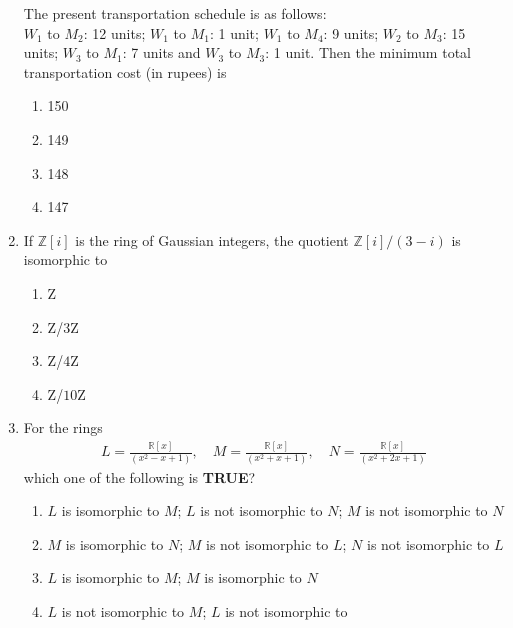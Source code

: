 \documentclass[journal]{IEEEtran}
\numberwithin{equation}{enumi}
\numberwithin{figure}{enumi}
\begin{document}
\begin{enumerate}
The present transportation schedule is as follows: \\
$W_1$ to $M_2$: 12 units; $W_1$ to $M_1$: 1 unit; $W_1$ to $M_4$: 9 units; $W_2$ to $M_3$: 15 units; $W_3$ to $M_1$: 7 units and $W_3$ to $M_3$: 1 unit. Then the minimum total transportation cost (in rupees) is
\hfill{}
\begin{multicols}{4}
\begin{enumerate}
\item  150
\item  149
\item  148 
\item  147 
\end{enumerate}
\end{multicols}


\item If $\mathbb{Z}[i]$ is the ring of Gaussian integers, the quotient $\mathbb{Z}[i]/(3-i)$ is isomorphic to
\hfill{}
\begin{multicols}{4}
\begin{enumerate}
\item  Z
\item  Z/$3$Z
\item  Z/$4$Z
\item  Z/$10$Z 
\end{enumerate}
\end{multicols}




\item For the rings
\begin{align*}
L = \frac{\mathbb{R}[x]}{(x^2 - x + 1)}, \quad
M = \frac{\mathbb{R}[x]}{(x^2 + x + 1)}, \quad
N = \frac{\mathbb{R}[x]}{(x^2 + 2x + 1)}
\end{align*}
which one of the following is \textbf{TRUE}?
\hfill{}
\begin{enumerate}
    \item $L$ is isomorphic to $M$; $L$ is not isomorphic to $N$; $M$ is not isomorphic to $N$
    \item  $M$ is isomorphic to $N$; $M$ is not isomorphic to $L$; $N$ is not isomorphic to $L$
    \item $L$ is isomorphic to $M$; $M$ is isomorphic to $N$
    \item $L$ is not isomorphic to $M$; $L$ is not isomorphic to
    \end{enumerate}
    


\end{enumerate}
\end{document}
